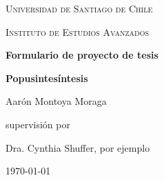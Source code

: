\documentclass[10pt]{article}
\begin{document}
\begin{titlepage}
	\centering
	{\LARGE \textsc{Universidad de Santiago de Chile}\par}
	\vspace{1cm}
	{\Large \textsc{Instituto de Estudios Avanzados}\par}
	\vspace{1.5cm}
	{\huge\bfseries Formulario de proyecto de tesis\par}
	\vspace{2cm}
	{\huge\bfseries Popusintesíntesis\par}
	\vspace{2cm}
	{\Large Aarón Montoya Moraga\par}
	\vfill
	supervisión por \par
	Dra. Cynthia Shuffer, por ejemplo

	\vfill

	{\large \today\par}
\end{titlepage}

\newpage

\tableofcontents

\newpage




\newpage



\newpage




\newpage



\newpage



\newpage



\newpage



\newpage



\newpage



\newpage


\end{document}
